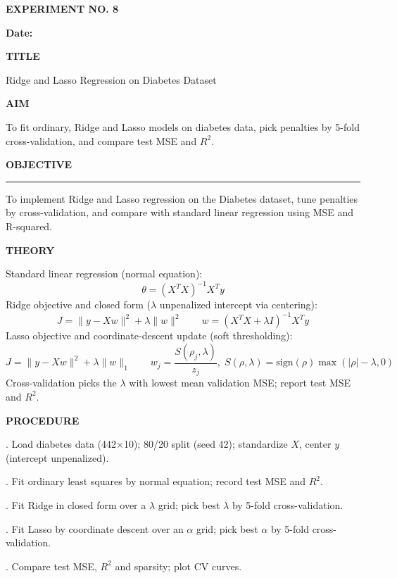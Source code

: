 \documentclass[11pt,twoside]{article}
\newcommand{\expheading}[1]{{\fontsize{14}{17}\selectfont\textbf{#1}\par}}
\newcommand{\fullrule}{\noindent\rule{\textwidth}{0.6pt}\par}
\begin{document}
\sloppy

{\setlength{\parskip}{1pt}\setlength{\abovedisplayskip}{2pt}\setlength{\belowdisplayskip}{2pt}
\begin{center}
\expheading{EXPERIMENT NO. 8}
\end{center}
\vspace{2pt}

\noindent\textbf{Date:} \underline{\hspace{2.6cm}}\par
\vspace{6pt}

\expheading{TITLE}
\vspace{4pt}
\noindent Ridge and Lasso Regression on Diabetes Dataset\par
\vspace{4pt}

\expheading{AIM}
\vspace{4pt}
\noindent To fit ordinary, Ridge and Lasso models on diabetes data, pick penalties by 5-fold cross-validation, and compare test MSE and $R^2$. \par
\vspace{4pt}

\expheading{OBJECTIVE}
\vspace{2pt}
\fullrule
\vspace{4pt}
\noindent To implement Ridge and Lasso regression on the Diabetes dataset, tune penalties by cross-validation, and compare with standard linear regression using MSE and R-squared. \par
\vspace{4pt}

\expheading{THEORY}
\vspace{4pt}
Standard linear regression (normal equation):
\[\theta=(X^TX)^{-1}X^Ty\]
Ridge objective and closed form ($\lambda$ unpenalized intercept via centering):
\[J=\|y-Xw\|^2+\lambda\|w\|^2\qquad w=(X^TX+\lambda I)^{-1}X^Ty\]
Lasso objective and coordinate-descent update (soft thresholding):
\[J=\|y-Xw\|^2+\lambda\|w\|_1\qquad w_j=\frac{S(\rho_j,\lambda)}{z_j},\;S(\rho,\lambda)=\mathrm{sign}(\rho)\max(|\rho|-\lambda,0)\]
Cross-validation picks the $\lambda$ with lowest mean validation MSE; report test MSE and $R^2$.
\vspace{4pt}

\expheading{PROCEDURE}
\vspace{4pt}
. Load diabetes data (442$\times$10); 80/20 split (seed 42); standardize $X$, center $y$ (intercept unpenalized).\par
{}. Fit ordinary least squares by normal equation; record test MSE and $R^2$.\par
{}. Fit Ridge in closed form over a $\lambda$ grid; pick best $\lambda$ by 5-fold cross-validation.\par
{}. Fit Lasso by coordinate descent over an $\alpha$ grid; pick best $\alpha$ by 5-fold cross-validation.\par
{}. Compare test MSE, $R^2$ and sparsity; plot CV curves. \par
\vspace{4pt}

}
\end{document}

